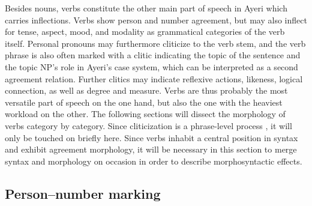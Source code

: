 Besides nouns, verbs constitute the other main part of speech in Ayeri which 
carries inflections. Verbs show person and number agreement, but may also 
inflect for tense, aspect, mood, and modality as grammatical categories of the 
verb itself. Personal pronouns may furthermore cliticize to the verb stem, and 
the verb phrase is also often marked with a clitic indicating the topic of 
the sentence and the topic NP's role in Ayeri's case system, which can be 
interpreted as a second agreement relation. Further clitics may indicate 
reflexive actions, likeness, logical connection, as well as degree and measure. 
Verbs are thus probably the most versatile part of speech on the one hand, but 
also the one with the heaviest workload on the other. The following sections 
will dissect the morphology of verbs category by category. Since cliticization 
is a phrase-level process \citep{klavans1985}, it will only be touched on 
briefly here. Since verbs inhabit a central position in syntax and exhibit 
agreement morphology, it will be necessary in this section to merge syntax and 
morphology on occasion in order to describe morphosyntactic effects.

\subsection{Person--number marking}
\label{subsec:persnumagr}

